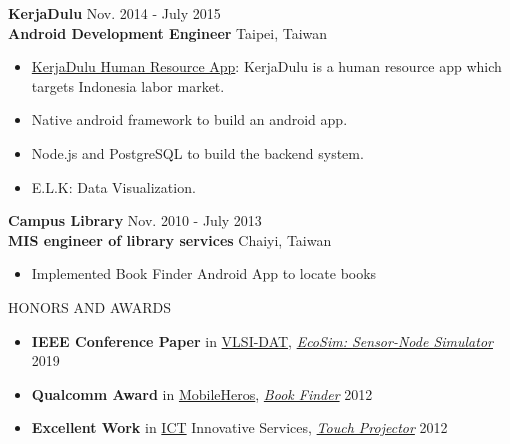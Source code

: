 \documentclass{res}
\makeatletter
\renewcommand{\section}{\@startsection{section}{1}{0mm}
  {-\baselineskip}{0.5\baselineskip}{\bf\leftline}}
\makeatother
\begin{document}
\begin{resume}
	 			{\bf KerjaDulu }                                {\hfill  Nov. 2014 - July 2015}\\
				{\bf Android Development Engineer}			    	 {\hfill Taipei, Taiwan}

				\begin{itemize}
					\item {\href{https://www.techinasia.com/kerjadulu-funding-mnc-group}{KerjaDulu Human Resource App}}: KerjaDulu is a human resource app which targets Indonesia labor market.
					\vspace{-0.05in}
					\item Native android framework to build an android app.
					\vspace{-0.05in}
					\item Node.js and PostgreSQL to build the backend system.
					\vspace{-0.05in}
					\item E.L.K: Data Visualization.
				\end{itemize}
				\vspace{-0.10in}

				{\bf Campus Library}                            {\hfill  Nov. 2010 - July 2013}\\
				{\bf MIS engineer of library services}            {\hfill Chaiyi, Taiwan}
				\begin{itemize}
					\item Implemented B​ook Finder Android App to locate books
				\end{itemize}

			\section{HONORS AND AWARDS}
				\begin{itemize}
					\item {\bf IEEE Conference Paper} in \href{https://expo.itri.org.tw/2019VLSIDAT/Program/SessionView/Regular}{VLSI-DAT}, \href{https://hdl.handle.net/11296/x3c4a6}{\sl EcoSim: Sensor-Node Simulator} \hfill 2019
					\vspace{-0.05in}
					\item {\bf Q​ualcomm Award} in \href{https://www.mobilehero.com/component/k2/item/209-a2012_11-10.html?Itemid=196}{MobileHeros}, \href{https://www.youtube.com/watch?v=BvLKtrgq_yw}{\sl B​ook Finder} \hfill 2012
					\vspace{-0.05in}
					\item {\bf Excellent Work} in \href{http://innoserve.tca.org.tw/en/index.aspx}{ICT} Innovative Services, \href{https://www.youtube.com/watch?v=nt4eUAXqXyk}{\sl T​ouch Projector​} \hfill 2012
				\end{itemize}


\end{resume}
\end{document}
